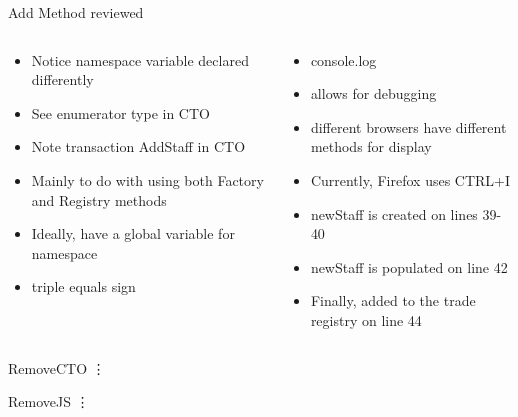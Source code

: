 \documentclass[pdf,table]{beamer}
\begin{document}
\begin{frame}{Add Method reviewed}
	\begin{columns}[T]
		\begin{column}{0.48\textwidth}
			\begin{itemize}
				\item Notice namespace variable declared differently
				\item See enumerator type in CTO
				\item Note transaction AddStaff in CTO %
				\item Mainly to do with using both Factory and Registry methods
				\item Ideally, have a global variable for namespace
				\item triple equals sign
			\end{itemize}
		\end{column}
		\begin{column}{0.48\textwidth}
			\begin{itemize}
				\item console.log
				\item allows for debugging
				\item different browsers have different methods for display
				\item Currently, Firefox uses CTRL+I
				\item newStaff is created on lines 39-40
				\item newStaff is populated on line 42
				\item Finally, added to the trade registry on line 44
			\end{itemize}
		\end{column}
	\end{columns}	
\end{frame}


\begin{frame}{Remove}{CTO}
	\vdots
	
\end{frame}


\begin{frame}{Remove}{JS}
	\vdots
	
\end{frame}
\end{document}
